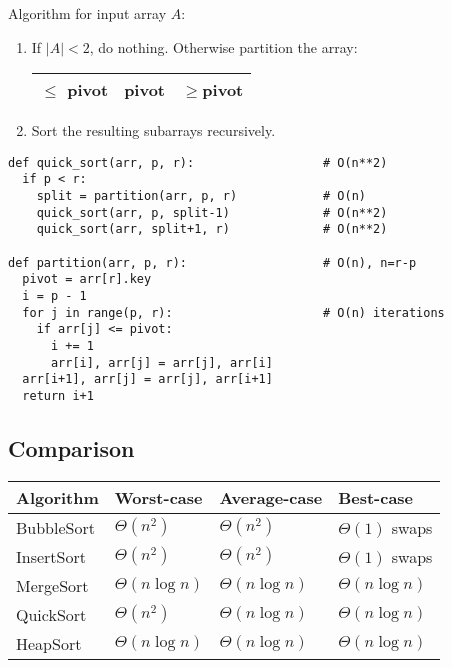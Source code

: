 \documentclass{article}
\begin{document}
Algorithm for input array $A$:
\begin{enumerate}
	\item If $|A|<2$, do nothing. Otherwise partition the array:
	      \begin{tabular}{|c|c|c|}
		      \hline
		      $\leq$ pivot & pivot & $\geq$pivot \\
		      \hline
	      \end{tabular}
	\item Sort the resulting subarrays recursively.
\end{enumerate}

\begin{verbatim}
def quick_sort(arr, p, r):                  # O(n**2)
  if p < r:
    split = partition(arr, p, r)            # O(n)
    quick_sort(arr, p, split-1)             # O(n**2)
    quick_sort(arr, split+1, r)             # O(n**2)

def partition(arr, p, r):                   # O(n), n=r-p
  pivot = arr[r].key
  i = p - 1
  for j in range(p, r):                     # O(n) iterations
    if arr[j] <= pivot:
      i += 1
      arr[i], arr[j] = arr[j], arr[i]
  arr[i+1], arr[j] = arr[j], arr[i+1]
  return i+1
\end{verbatim}

\subsection{Comparison}

\begin{center}
	\begin{tabular}{l | l | l | l}
		\textbf{Algorithm} & \textbf{Worst-case} & \textbf{Average-case} & \textbf{Best-case}
		\\\hline
		BubbleSort         & $\Theta(n^2)$       & $\Theta(n^2)$         & $\Theta(1)$ swaps
		\\\hline
		InsertSort         & $\Theta(n^2)$       & $\Theta(n^2)$         & $\Theta(1)$ swaps
		\\\hline
		MergeSort          & $\Theta(n\log n)$   & $\Theta(n\log n)$     & $\Theta(n\log n)$
		\\\hline
		QuickSort          & $\Theta(n^2)$       & $\Theta(n\log n)$     & $\Theta(n\log n)$
		\\\hline
		HeapSort           & $\Theta(n\log n)$   & $\Theta(n\log n)$     & $\Theta(n\log n)$
	\end{tabular}
\end{center}
\end{document}
